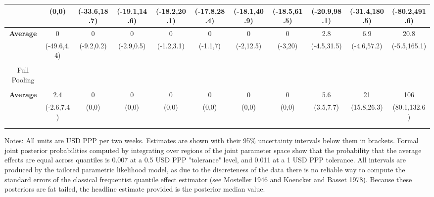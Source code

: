\documentclass[AER]{AEA}
\begin{document}
\begin{landscape}
\begin{table}[!htbp]
\begin{tabular}{@{\extracolsep{5pt}} ccccccccccc}
& (0,0) & (-33.6,18.7) & (-19.1,14.6) & (-18.2,20.1) & (-17.8,28.4) & (-18.1,40.9) & (-18.5,61.5) & (-20.9,98.1) & (-31.4,180.5) & (-80.2,491.6) \\
\hline
\textbf{Average} & 0 & 0 & 0 & 0 & 0 & 0 & 0 & 2.8 & 6.9 & 20.8 \\
 & (-49.6,4.4) & (-9.2,0.2) & (-2.9,0.5) & (-1.2,3.1) & (-1.1,7) & (-2,12.5) & (-3,20) & (-4.5,31.5) & (-4.6,57.2) & (-5.5,165.1) \\
 \hline \\[-1.8ex]
Full Pooling &&&&&&&&&& \\
\hline \\[-1.8ex]
\textbf{Average} & 2.4 & 0 & 0 & 0 & 0 & 0 & 0 & 5.6 & 21 & 106 \\
 & (-2.6,7.4) & (0,0) & (0,0) & (0,0) & (0,0) & (0,0) & (0,0) & (3.5,7.7) & (15.8,26.3) & (80.1,132.6) \\
\hline \\[-1.8ex]

\hline \\[-1.8ex]

\end{tabular}
\raggedright{\scriptsize Notes: All units are USD PPP per two weeks. Estimates are shown with their 95\% uncertainty intervals below them in brackets. Formal joint posterior probabilities computed by integrating over regions of the joint parameter space show that the probability that the average effects are equal across quantiles is 0.007 at a 0.5 USD PPP "tolerance" level, and 0.011 at a 1 USD PPP tolerance. All intervals are produced by the tailored parametric likelihood model, as due to the discreteness of the data there is no reliable way to compute the standard errors of the classical frequentist quantile effect estimator (see Mosteller 1946 and Koencker and Basset 1978). Because these posteriors are fat tailed, the headline estimate provided is the posterior median value. }

\end{table}

\end{landscape}
\end{document}
